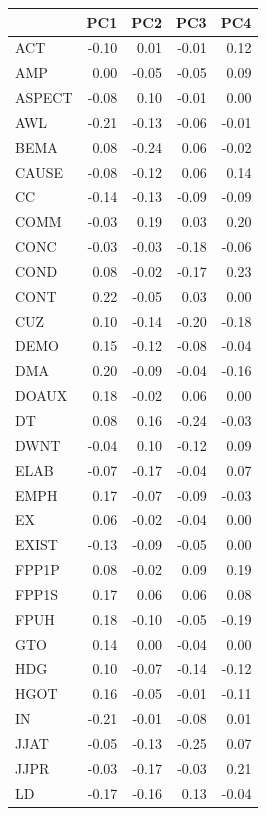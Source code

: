 \documentclass[
  letterpaper,
  DIV=11,
  numbers=noendperiod]{scrreprt}
\begin{document}
\begin{longtable}[]{@{}lrrrr@{}}
\toprule\noalign{}
& PC1 & PC2 & PC3 & PC4 \\
\midrule\noalign{}
\endhead
\bottomrule\noalign{}
\endlastfoot
ACT & -0.10 & 0.01 & -0.01 & 0.12 \\
AMP & 0.00 & -0.05 & -0.05 & 0.09 \\
ASPECT & -0.08 & 0.10 & -0.01 & 0.00 \\
AWL & -0.21 & -0.13 & -0.06 & -0.01 \\
BEMA & 0.08 & -0.24 & 0.06 & -0.02 \\
CAUSE & -0.08 & -0.12 & 0.06 & 0.14 \\
CC & -0.14 & -0.13 & -0.09 & -0.09 \\
COMM & -0.03 & 0.19 & 0.03 & 0.20 \\
CONC & -0.03 & -0.03 & -0.18 & -0.06 \\
COND & 0.08 & -0.02 & -0.17 & 0.23 \\
CONT & 0.22 & -0.05 & 0.03 & 0.00 \\
CUZ & 0.10 & -0.14 & -0.20 & -0.18 \\
DEMO & 0.15 & -0.12 & -0.08 & -0.04 \\
DMA & 0.20 & -0.09 & -0.04 & -0.16 \\
DOAUX & 0.18 & -0.02 & 0.06 & 0.00 \\
DT & 0.08 & 0.16 & -0.24 & -0.03 \\
DWNT & -0.04 & 0.10 & -0.12 & 0.09 \\
ELAB & -0.07 & -0.17 & -0.04 & 0.07 \\
EMPH & 0.17 & -0.07 & -0.09 & -0.03 \\
EX & 0.06 & -0.02 & -0.04 & 0.00 \\
EXIST & -0.13 & -0.09 & -0.05 & 0.00 \\
FPP1P & 0.08 & -0.02 & 0.09 & 0.19 \\
FPP1S & 0.17 & 0.06 & 0.06 & 0.08 \\
FPUH & 0.18 & -0.10 & -0.05 & -0.19 \\
GTO & 0.14 & 0.00 & -0.04 & 0.00 \\
HDG & 0.10 & -0.07 & -0.14 & -0.12 \\
HGOT & 0.16 & -0.05 & -0.01 & -0.11 \\
IN & -0.21 & -0.01 & -0.08 & 0.01 \\
JJAT & -0.05 & -0.13 & -0.25 & 0.07 \\
JJPR & -0.03 & -0.17 & -0.03 & 0.21 \\
LD & -0.17 & -0.16 & 0.13 & -0.04 \\

\end{longtable}
\end{document}
